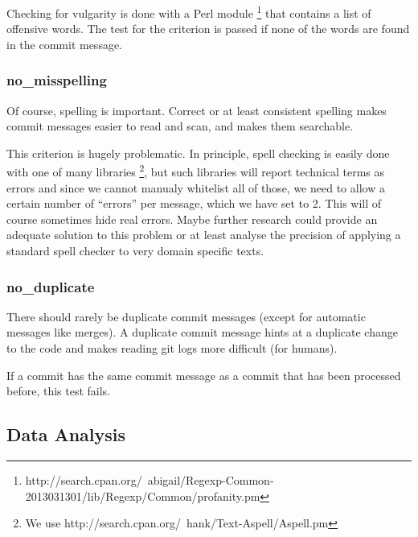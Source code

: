 Checking for vulgarity is done with a Perl module \footnote{http://search.cpan.org/~abigail/Regexp-Common-2013031301/lib/Regexp/Common/profanity.pm} that contains a list of offensive words. The test for the criterion is passed if none of the words are found in the commit message.

\subsubsection{no\_misspelling}
\label{subs:no_misspelling}
Of course, spelling is important. Correct or at least consistent spelling makes commit messages easier to read and scan, and makes them searchable.

This criterion is hugely problematic. In principle, spell checking is easily done with one of many libraries \footnote{We use http://search.cpan.org/~hank/Text-Aspell/Aspell.pm}, but such libraries will report technical terms as errors and since we cannot manualy whitelist all of those, we need to allow a certain number of ``errors'' per message, which we have set to 2. This will of course sometimes hide real errors. Maybe further research could provide an adequate solution to this problem or at least analyse the precision of applying a standard spell checker to very domain specific texts.

\subsubsection{no\_duplicate}
\label{subs:no_duplicate}
There should rarely be duplicate commit messages (except for automatic messages like merges). A duplicate commit message hints at a duplicate change to the code and makes reading git logs more difficult (for humans).

If a commit has the same commit message as a commit that has been processed before, this test fails.


\subsection{Data Analysis}
\label{sub:analysis}

